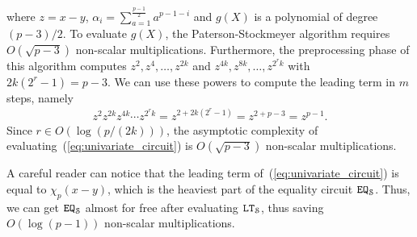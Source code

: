   where $z = x - y$, $\alpha_i = \sum_{a=1}^{\frac{p-1}{2}} a^{p-1-i}$ and $g(X)$ is a polynomial of degree $(p-3)/2$.
  To evaluate $g(X)$, the Paterson-Stockmeyer algorithm requires $O(\sqrt{p-3})$ non-scalar multiplications.
  Furthermore, the preprocessing phase of this algorithm computes $z^2, z^4, \dots, z^{2k}$ and $z^{4k}, z^{8k}, \dots, z^{2^r k}$ with $2k(2^r-1) = p-3$.
  We can use these powers to compute the leading term in $m$ steps, namely
  \begin{align*}
    z^2 z^{2k} z^{4k} \cdots z^{2^r k} = z^{2 + 2k(2^r-1)} = z^{2 + p - 3} = z^{p-1}.
  \end{align*}
  Since $r \in O(\log (p/(2k)))$, the asymptotic complexity of evaluating~(\ref{eq:univariate_circuit}) is $O(\sqrt{p-3})$ non-scalar multiplications.
  
  \begin{remark}
    A careful reader can notice that the leading term of~(\ref{eq:univariate_circuit}) is equal to $\chi_p(x-y)$, which is the heaviest part of the equality circuit $\mathtt{EQ}_{\mathcal{S}}$.
    Thus, we can get $\mathtt{EQ}_{\mathcal{S}}$ almost for free after evaluating $\mathtt{LT}_{\mathcal{S}}$, thus saving $O(\log (p-1))$ non-scalar multiplications.
  \end{remark}

